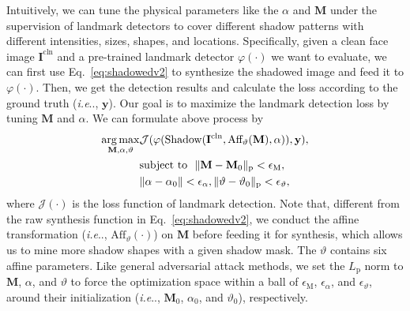 \documentclass[10pt,twocolumn,letterpaper]{article}
\makeatletter
\def\argmax{\operatornamewithlimits{arg\,max}}
\newcommand{\reqref}[1]{Eq.~\eqref{#1}}
\DeclareRobustCommand\onedot{\futurelet\@let@token\@onedot}
\def\@onedot{\ifx\@let@token.\else.\null\fi\xspace}
\def\ie{\emph{i.e}\onedot} \def\Ie{\emph{I.e}\onedot}
\newcommand{\yu}[1]{\textbf{\textcolor{blue}{Yu: #1}}}
\newcommand{\felix}[1]{\textbf{\textcolor{magenta}{Felix: #1}}}
\makeatother
\begin{document}
Intuitively, we can tune the physical parameters like the $\alpha$ and $\mathbf{M}$ under the supervision of landmark detectors to cover different shadow patterns with different intensities, sizes, shapes, and locations.
%
Specifically, given a clean face image $\mathbf{I}^\text{cln}$ and a pre-trained landmark detector $\varphi(\cdot)$ we want to evaluate, we can first use \reqref{eq:shadowedv2} to synthesize the shadowed image and feed it to $\varphi(\cdot)$. Then, we get the detection results and calculate the loss according to the ground truth (\ie, $\mathbf{y}$). Our goal is to maximize the landmark detection loss by tuning $\mathbf{M}$ and $\alpha$. We can formulate above process by
%
\begin{align}\label{eq:adv_obj}
\argmax_{\mathbf{M},\alpha,\vartheta} &\mathcal{J}(\varphi(\text{Shadow}(\mathbf{I}^\text{cln}, \text{Aff}_\vartheta(\mathbf{M}),\alpha)), \mathbf{y}), \nonumber\\
&\text{subject~to~~}\|\mathbf{M}-\mathbf{M}_0\|_\text{p}<\epsilon_\text{M}, \nonumber \\
&\|\alpha-\alpha_0\|<\epsilon_{\alpha}, \|\vartheta-\vartheta_0\|_\text{p}<\epsilon_{\vartheta},
\end{align}
%
where $\mathcal{J}(\cdot)$ is the loss function of landmark detection. Note that, different from the raw synthesis function in \reqref{eq:shadowedv2}, we conduct the affine transformation (\ie, $\text{Aff}_{\vartheta}(\cdot)$) on $\mathbf{M}$ before feeding it for synthesis, which allows us to mine more shadow shapes with a given shadow mask. The $\vartheta$ contains six affine parameters. Like general adversarial attack methods, we set the $L_\text{p}$ norm to $\mathbf{M}$, $\alpha$, and $\vartheta$ to force the optimization space within a ball of $\epsilon_\text{M}$, $\epsilon_{\alpha}$, and $\epsilon_{\vartheta}$, around their initialization (\ie, $\mathbf{M}_0$, $\alpha_0$, and $\vartheta_0$), respectively.
\end{document}
